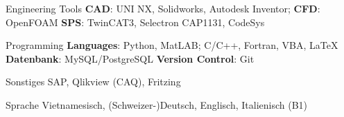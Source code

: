 

\begin{cvskills}


  \cvskill
    {Engineering Tools} %
    {\textbf{CAD}: UNI NX, Solidworks, Autodesk Inventor; 
    \newline \textbf{CFD}: OpenFOAM
    \newline \textbf{SPS}: TwinCAT3, Selectron CAP1131, CodeSys
}
%

  \cvskill
    {Programming} %
    {\textbf{Languages}: Python, MatLAB; C/C++, Fortran, VBA, LaTeX 
    	\newline \textbf{Datenbank}: MySQL/PostgreSQL
    	\newline \textbf{Version Control}: Git
    	} %

  \cvskill
    {Sonstiges} %
    {SAP, Qlikview (CAQ), Fritzing} %

  \cvskill
    {Sprache} %
    {Vietnamesisch, (Schweizer-)Deutsch, Englisch, Italienisch (B1)} %

\end{cvskills}
